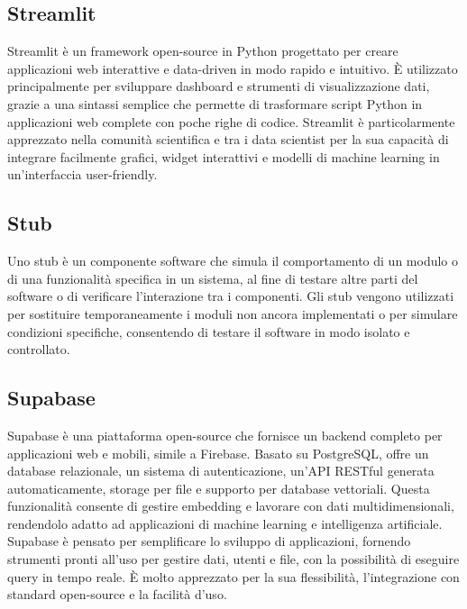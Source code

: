 \hypertarget{sec:streamlit}{}
\subsection*{Streamlit}
Streamlit è un framework open-source in Python progettato per creare applicazioni web interattive e data-driven in modo rapido e intuitivo. È utilizzato 
principalmente per sviluppare dashboard e strumenti di visualizzazione dati, grazie a una sintassi semplice che permette di trasformare script Python in 
applicazioni web complete con poche righe di codice. Streamlit è particolarmente apprezzato nella comunità scientifica e tra i data scientist per la sua 
capacità di integrare facilmente grafici, widget interattivi e modelli di machine learning in un'interfaccia user-friendly.

\hypertarget{sec:stub}{}
\subsection*{Stub}
Uno stub è un componente software che simula il comportamento di un modulo o di una funzionalità specifica in un sistema, al fine di testare altre parti
del software o di verificare l'interazione tra i componenti. Gli stub vengono utilizzati per sostituire temporaneamente i moduli non ancora implementati
o per simulare condizioni specifiche, consentendo di testare il software in modo isolato e controllato.

\hypertarget{sec:supabase}{}
\subsection*{Supabase}
Supabase è una piattaforma open-source che fornisce un backend completo per applicazioni web e mobili, simile a Firebase. Basato su PostgreSQL, offre un 
database relazionale, un sistema di autenticazione, un'API RESTful generata automaticamente, storage per file e supporto per database vettoriali. Questa 
funzionalità consente di gestire embedding e lavorare con dati multidimensionali, rendendolo adatto ad applicazioni di machine learning e intelligenza 
artificiale. Supabase è pensato per semplificare lo sviluppo di applicazioni, fornendo strumenti pronti all'uso per gestire dati, utenti e file, con la 
possibilità di eseguire query in tempo reale. È molto apprezzato per la sua flessibilità, l'integrazione con standard open-source e la facilità d'uso.

\newpage



